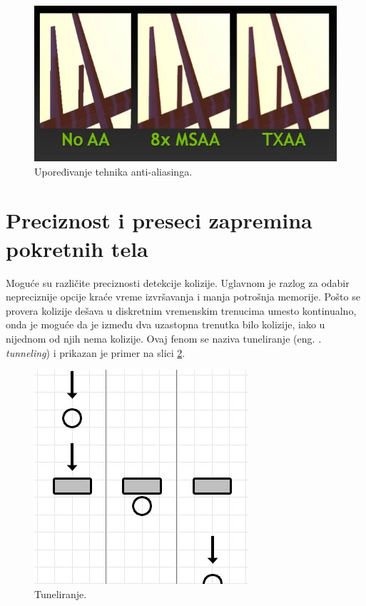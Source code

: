 \documentclass[12pt,oneside]{memoir}
\begin{document}
\begin{figure}[h!]
	\begin{center}
	\includegraphics[scale=0.65]{txaa.png}
	\end{center}
	\caption{Upoređivanje tehnika anti-aliasinga.}
	\label{fig:txaa}
\end{figure}

\section{Preciznost i preseci zapremina pokretnih tela}

Moguće su različite preciznosti detekcije kolizije. 
Uglavnom je razlog za odabir nepreciznije opcije kraće vreme izvršavanja i manja potrošnja memorije.
Pošto se provera kolizije dešava u diskretnim vremenskim trenucima umesto kontinualno, onda je moguće da 
je između dva uzastopna trenutka bilo kolizije, iako u nijednom od njih nema kolizije. 
Ovaj fenom se naziva tuneliranje (eng. {\em. tunneling}) i prikazan je primer na slici \ref{fig:tunnel}. 

\begin{figure}[h!]
	\begin{center}
	\includegraphics[scale=0.55]{tunnel.png}
	\end{center}
	\caption{Tuneliranje.}
	\label{fig:tunnel}
\end{figure}
\end{document}
